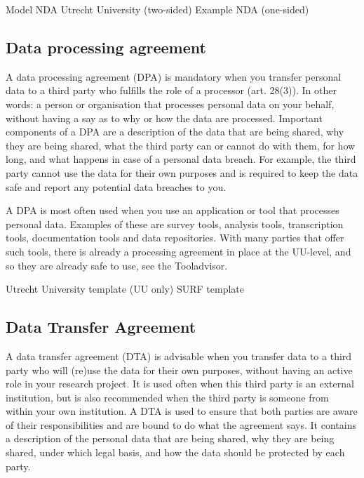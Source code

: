 \documentclass[
]{book}
\begin{document}
Model NDA Utrecht University (two-sided)
Example NDA (one-sided)

\hypertarget{data-processing-agreement}{%
\subsection{Data processing agreement}\label{data-processing-agreement}}

A data processing agreement (DPA) is mandatory when you transfer personal data
to a third party who fulfills the role of a processor
(art. 28(3)).
In other words: a person or organisation that processes personal data on your
behalf, without having a say as to why or how the data are processed. Important
components of a DPA are a description of the data that are being shared, why
they are being shared, what the third party can or cannot do with them, for how
long, and what happens in case of a personal data breach. For example, the third
party cannot use the data for their own purposes and is required to keep the
data safe and report any potential data breaches to you.

A DPA is most often used when you use an application or tool that processes
personal data. Examples of these are survey tools, analysis tools, transcription
tools, documentation tools and data repositories. With many parties that offer
such tools, there is already a processing agreement in place at the UU-level,
and so they are already safe to use, see the
Tooladvisor.

Utrecht University template (UU only)
SURF template

\hypertarget{data-transfer-agreement}{%
\subsection{Data Transfer Agreement}\label{data-transfer-agreement}}

A data transfer agreement (DTA) is advisable when you transfer data to a third
party who will (re)use the data for their own purposes, without having an
active role in your research project. It is used often when this third party is
an external institution, but is also recommended when the third party is someone
from within your own institution. A DTA is used to ensure that both parties are
aware of their responsibilities and are bound to do what the agreement says. It
contains a description of the personal data that are being shared, why they are
being shared, under which legal basis, and how the data should be protected by
each party.
\end{document}
